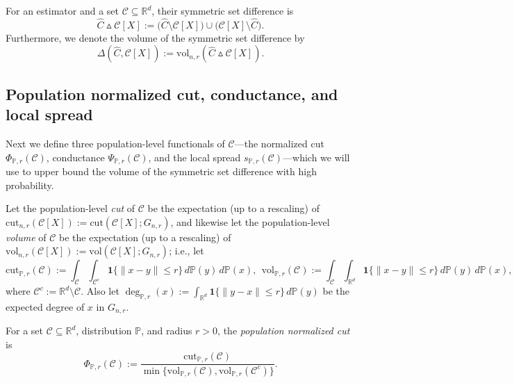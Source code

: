 \documentclass[11pt,twoside]{article}
\newcommand{\Reals}{\mathbb{R}}
\newcommand{\1}{\mathbf{1}}
\newcommand{\Rd}{\Reals^d}
\newcommand{\mc}[1]{\mathcal{#1}}
\newcommand{\Pbb}{\mathbb{P}}
\newcommand{\wh}[1]{\widehat{#1}}
\newcommand{\vol}{\mathrm{vol}}
\newcommand{\cut}{\mathrm{cut}}
\begin{document}
\begin{definition}
	\label{def:volume_symmetric_set_difference}
	For an estimator \smash{$\wh{C} \subseteq X$} and a set $\mc{C} \subseteq \Rd$, their symmetric set difference is  
	\begin{equation*}
	\wh{C} \vartriangle \mc{C}[X] :=
	\bigl(\wh{C} \setminus \mc{C}[X]\bigr) \cup
	\bigl(\mc{C}[X] \setminus \wh{C}\bigr).
	\end{equation*}
	Furthermore, we denote the volume of the symmetric set difference by 
	$$
	\Delta(\wh{C}, \mc{C}[X]) := \vol_{n,r}(\wh{C} \vartriangle \mc{C}[X]). 
	$$
\end{definition}

\subsection{Population normalized cut, conductance, and local spread}
Next we define three population-level functionals of $\mc{C}$---the normalized cut $\Phi_{\Pbb,r}(\mc{C})$, conductance $\Psi_{\Pbb,r}(\mc{C})$, and the local spread $s_{\Pbb,r}(\mc{C})$---which we will use to upper bound the volume of the symmetric set difference \smash{$\Delta(\wh{C},\mc{C}[X])$} with high probability.

Let the population-level \emph{cut} of $\mc{C}$ be the expectation (up to a rescaling) of $\cut_{n,r}(\mc{C}[X]) := \cut(\mc{C}[X]; G_{n,r})$,  and likewise let the population-level \emph{volume} of $\mc{C}$ be the expectation (up to a rescaling) of $\vol_{n,r}(\mc{C}[X]) := \vol(\mc{C}[X]; G_{n,r})$; i.e., let
\begin{equation*}
\mathrm{cut}_{\Pbb,r}(\mc{C}) := \int_{\mc{C}} \int_{\mc{C}^c} \1\{\|x - y\| \leq r\} \,d\Pbb(y) \,d\Pbb(x),~~ \mathrm{vol}_{\Pbb,r}(\mc{C}) := \int_{\mc{C}} \int_{\Rd} \1\{\|x - y\| \leq r\} \,d\Pbb(y) \,d\Pbb(x),
\end{equation*}
where $\mc{C}^c := \Rd \!\setminus\! \mc{C}$. Also let $\deg_{\Pbb,r}(x) := \int_{\Rd} \1\{\|y - x\| \leq r\} \,d\Pbb(y)$ be the expected degree of $x$ in $G_{n,r}$. 
\begin{definition}
	For a set $\mc{C} \subseteq \Rd$, distribution $\Pbb$, and radius $r > 0$, the \emph{population normalized cut} is
	\begin{equation}
	\label{eqn:population_normalized_cut}
	\Phi_{\Pbb,r}(\mc{C}) := \frac{\mathrm{cut}_{\Pbb,r}(\mc{C})}{\min\{\mathrm{vol}_{\Pbb,r}(\mc{C}), \mathrm{vol}_{\Pbb,r}(\mc{C}^c)\}}.
	\end{equation}
\end{definition}
\end{document}
